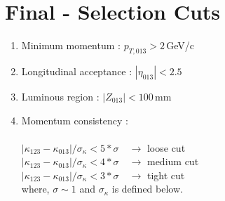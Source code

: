 \documentclass[11pt,a4paper]{article}
\begin{document}
\section*{Final - Selection Cuts}
\begin{enumerate}
\item Minimum momentum : $ p_{T, 013} > 2$\,GeV/c
\item Longitudinal acceptance : $|\eta_{013}| < 2.5$
\item Luminous region : $|Z_{013}| < 100$\,mm
\item Momentum consistency : \\\\
$|\kappa_{123} - \kappa_{013}| / \sigma_{\kappa} < 5*\sigma \quad \rightarrow$ loose cut \\
$|\kappa_{123} - \kappa_{013}| / \sigma_{\kappa} < 4*\sigma \quad \rightarrow $ medium cut \\
$|\kappa_{123} - \kappa_{013}| / \sigma_{\kappa} < 3*\sigma \quad \rightarrow$ tight cut \\
where, $\sigma \sim 1 $ and $\sigma_{\kappa}$ is defined below.
\end{enumerate}
\end{document}
